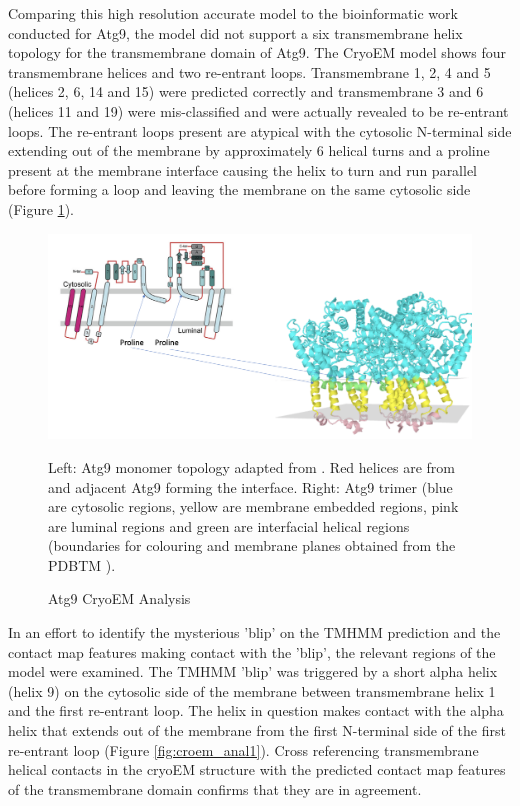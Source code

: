 Comparing this high resolution accurate model to the bioinformatic work conducted for Atg9, the model did not support a six transmembrane helix topology for the transmembrane domain of Atg9.  The CryoEM model shows four transmembrane helices and two re-entrant loops. Transmembrane 1, 2, 4 and 5 (helices 2, 6, 14 and 15) were predicted correctly and transmembrane 3 and 6 (helices 11 and 19) were mis-classified and were actually revealed to be re-entrant loops.  The re-entrant loops present are atypical with the cytosolic N-terminal side extending out of the membrane by approximately 6 helical turns and a proline present at the membrane interface causing the helix to turn and run parallel before forming a loop and leaving the membrane on the same cytosolic side (Figure \ref{fig:atg9_pro}). 

\begin{figure}[th!]
    \centering
\includegraphics[width=\linewidth]{Modelling of Atg9/h_res_cro_anal2.png}
    \caption{Atg9 CryoEM Analysis}
    \label{fig:atg9_pro}
    \small
    Left: Atg9 monomer topology adapted from \cite{guardia2020structure}. Red helices are from and adjacent Atg9 forming the interface. Right: Atg9 trimer (blue are cytosolic regions, yellow are membrane embedded regions, pink are luminal regions and green are interfacial helical regions (boundaries for colouring and membrane planes obtained from the PDBTM \cite{Kozma2012}).
\end{figure}

In an effort to identify the mysterious 'blip' on the TMHMM prediction and the contact map features making contact with the 'blip', the relevant regions of the model were examined. The  TMHMM 'blip' was triggered by a short alpha helix (helix 9) on the cytosolic side of the membrane between transmembrane helix 1 and the first re-entrant loop.  The helix in question makes contact with the alpha helix that extends out of the membrane from the first N-terminal side of the first re-entrant loop (Figure \ref{fig:croem_anal1}).  Cross referencing transmembrane helical contacts in the cryoEM structure with the predicted contact map features of the transmembrane domain confirms that they are in agreement.

